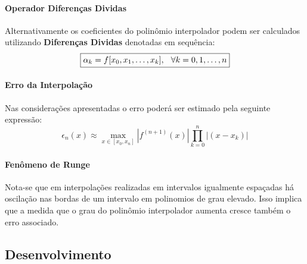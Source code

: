\documentclass{article}
\begin{document}
        \paragraph{Operador Diferenças Dividas}Alternativamente os coeficientes do polinômio interpolador podem ser calculados utilizando \textbf{Diferenças Dividas} denotadas em sequência:
            \[\boxed{\alpha_{k} = f[x_{0}, x_{1}, \dots, x_{k}], \hspace{2.5mm} \forall k = 0, 1, \dots, n}\]

        \paragraph{Erro da Interpolação}Nas considerações apresentadas o erro poderá ser estimado pela seguinte expressão:
            \[\boxed{\epsilon_{n}(x) \approx \max_{x\in [x_{0}, x_{n}]}|f^{(n+1)}(x)|\prod_{k=0}^{n}|(x - x_{k})|}\]

        \paragraph{Fenômeno de Runge}Nota-se que em interpolações realizadas em intervalos igualmente espaçadas há oscilação nas bordas de um intervalo em polinomios de grau elevado. Isso implica que a medida que o grau do polinômio interpolador aumenta cresce também o erro associado.

    \subsection{Desenvolvimento}
\end{document}
